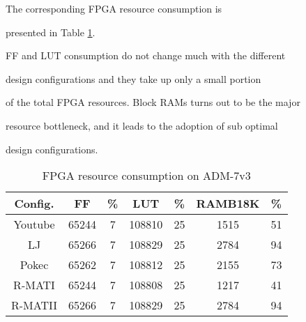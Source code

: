 The corresponding FPGA resource consumption is 

presented in Table \ref{tab:mem-resource}. 

FF and LUT consumption do not change much with the different 

design configurations and they take up only a small portion 

of the total FPGA resources. Block RAMs turns out to be the major 

resource bottleneck, and it leads to the adoption of sub optimal 

design configurations.



\begin{table}

  \vspace{-0.5em}

  \caption{FPGA resource consumption on ADM-7v3}

  \label{tab:mem-resource}

  \vspace{-0.3em}



    \centering

  \begin{tabular}{ccccccc}

    \toprule

      Config. & FF & \% & LUT & \% & RAMB18K & \% \\

    \midrule

      Youtube  & 65244 & 7 & 108810 & 25 & 1515  & 51 \\

      LJ       & 65266 & 7 & 108829 & 25 & 2784  & 94 \\

      Pokec    & 65262 & 7 & 108812 & 25 & 2155 & 73 \\

      R-MATI   & 65244 & 7 & 108808 & 25 & 1217 & 41 \\

      R-MATII  & 65266 & 7 & 108829 & 25 & 2784 & 94 \\

  \bottomrule

\end{tabular}

\vspace{-1em}

\end{table}



